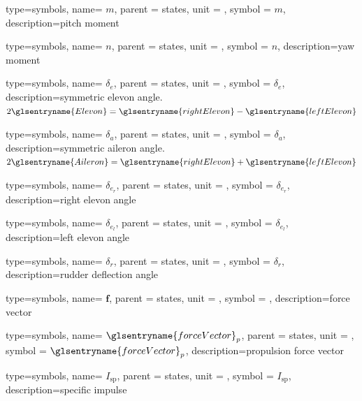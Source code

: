 {type=symbols,
	name= \ensuremath{m},
	parent = {states},
	unit = \unexpanded{\si{\newton\meter}},
	symbol = \ensuremath{m},
	description={pitch moment}
}

{type=symbols,
	name= \ensuremath{n},
	parent = {states},
	unit = \unexpanded{\si{\newton\meter}},
	symbol = \ensuremath{n},
	description={yaw moment}
}

{type=symbols,
	name= \ensuremath{\delta_{e}},
	parent = {states},
	unit = \unexpanded{\si{\radian}},
	symbol = \ensuremath{\delta_{e}},
	description={symmetric elevon angle. $2\glsentryname{Elevon}=\glsentryname{rightElevon}-\glsentryname{leftElevon}$}
}

{type=symbols,
	name= \ensuremath{\delta_{a}},
	parent = {states},
	unit = \unexpanded{\si{\radian}},
	symbol = \ensuremath{\delta_{a}},
	description={symmetric aileron angle. $2\glsentryname{Aileron}=\glsentryname{rightElevon}+\glsentryname{leftElevon}$}
}


{type=symbols,
	name= \ensuremath{\delta_{e_{r}}},
	parent = {states},
	unit = \unexpanded{\si{\radian}},
	symbol = \ensuremath{\delta_{e_{r}}},
	description={right elevon angle}
}


{type=symbols,
	name= \ensuremath{\delta_{e_{l}}},
	parent = {states},
	unit = \unexpanded{\si{\radian}},
	symbol = \ensuremath{\delta_{e_{l}}},
	description={left elevon angle}
}


{type=symbols,
	name= \ensuremath{\delta_{r}},
	parent = {states},
	unit = \unexpanded{\si{\radian}},
	symbol = \ensuremath{\delta_{r}},
	description={rudder deflection angle}
}

{type=symbols,
	name= \ensuremath{\mathbf{f}},
	parent = {states},
	unit = \unexpanded{\si{\newton}},
	symbol = ,
	description={force vector}
}

{type=symbols,
	name= \ensuremath{{\glsentryname{forceVector}}_{p}},
	parent = {states},
	unit = \unexpanded{\si{\newton}},
	symbol = \ensuremath{{\glsentryname{forceVector}}_{p}},
	description={propulsion force vector}
}

{type=symbols,
	name= \ensuremath{I_\textrm{sp}},
	parent = {states},
	unit = \unexpanded{\si{\second}},
	symbol = \ensuremath{I_\textrm{sp}},
	description={specific impulse}
}


